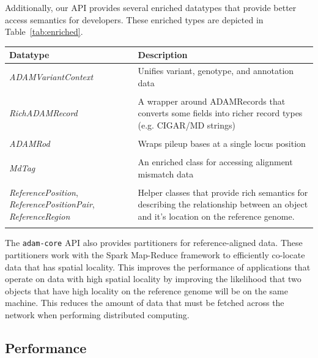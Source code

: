 \documentclass{bioinfo}
\begin{document}
Additionally, our API provides several enriched datatypes that provide better access semantics for developers. These enriched types are depicted in Table~\ref{tab:enriched}.

\begin{table}[h]
{\begin{tabular}{ p{2.5cm} p{5.5cm} }
\toprule
\bf Datatype & \bf Description \\
\midrule
\textit{ADAMVariantContext} & Unifies variant, genotype, and annotation data \\
 & \\
\textit{RichADAMRecord} & A wrapper around ADAMRecords that converts some fields into richer record types (e.g. CIGAR/MD strings) \\
 & \\
\textit{ADAMRod} & Wraps pileup bases at a single locus position \\
 & \\
\textit{MdTag} & An enriched class for accessing alignment mismatch data \\
 & \\
\textit{ReferencePosition}, \textit{ReferencePositionPair}, \textit{ReferenceRegion} & Helper classes that provide rich semantics for describing the relationship
between an object and it's location on the reference genome. \\
\botrule
\end{tabular}}{}
\end{table}

The \texttt{adam-core} API also provides partitioners for reference-aligned data. These partitioners work with the Spark Map-Reduce framework to efficiently co-locate data that
has spatial locality. This improves the performance of applications that operate on data with high spatial locality by improving the likelihood that two objects that have high
locality on the reference genome will be on the same machine. This reduces the amount of data that must be fetched across the network when performing distributed computing.

\subsection{Performance}
\label{sec:performance}
\end{document}
